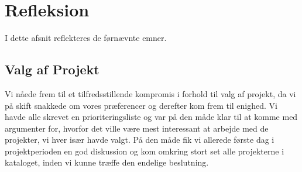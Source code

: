 %
%

\section{Refleksion}
I dette afsnit reflekteres de førnævnte emner.

\subsection{Valg af Projekt}
Vi nåede frem til et tilfredsstillende kompromis i forhold til valg af projekt, da vi på skift snakkede om vores præferencer og derefter kom frem til enighed. Vi havde alle skrevet en prioriteringsliste og var på den måde klar til at komme med argumenter for, hvorfor det ville være mest interessant at arbejde med de projekter, vi hver især havde valgt. På den måde fik vi allerede første dag i projektperioden en god diskussion og kom omkring stort set alle projekterne i kataloget, inden vi kunne træffe den endelige beslutning. 

